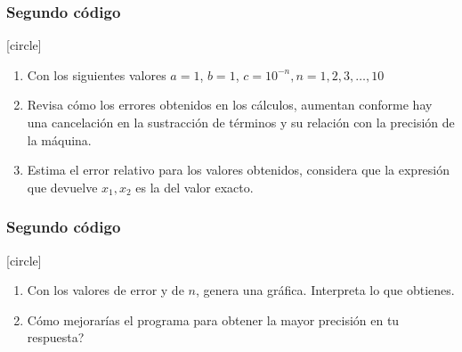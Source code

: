 \begin{frame}
\frametitle{Segundo código}
[circle]
\begin{enumerate}
\conti
\item Con los siguientes valores $a=1$, $b=1$, $c=10^{-n}, n = 1, 2, 3, \ldots, 10$
\item Revisa cómo los errores obtenidos en los cálculos, aumentan conforme hay una cancelación en la sustracción de términos y su relación con la precisión de la máquina.
\item Estima el error relativo para los valores obtenidos, considera que la expresión que devuelve $x_{1}, x_{2}$ es la del valor exacto.
\seti
\end{enumerate}
\end{frame}
\begin{frame}
\frametitle{Segundo código}
[circle]
\begin{enumerate}[<+->]
\conti
\item Con los valores de error y de $n$, genera una gráfica. Interpreta lo que obtienes.
\item Cómo mejorarías el programa para obtener la mayor precisión en tu respuesta?
\end{enumerate}
\end{frame}
